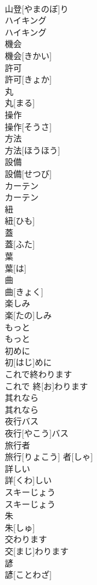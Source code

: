 \documentclass[8pt]{extreport}
\begin{document}
\begin{CJK}{UTF8}{min}
\\	山登[やまのぼ]り	
\\	ハイキング
\\	ハイキング
\\	機会	
\\	機会[きかい]	
\\	許可	
\\	許可[きょか]	
\\	丸	
\\	丸[まる]	
\\	操作	
\\	操作[そうさ]	
\\	方法	
\\	方法[ほうほう]	
\\	設備	
\\	設備[せつび]	
\\	カーテン	
\\	カーテン	
\\	紐	
\\	紐[ひも]	
\\	蓋	
\\	蓋[ふた]	
\\	葉	
\\	葉[は]	
\\	曲	
\\	曲[きょく]	
\\	楽しみ	
\\	楽[たの]しみ	
\\	もっと	
\\	もっと	
\\	初めに	
\\	初[はじ]めに	
\\	これで終わります	
\\	これで 終[お]わります	
\\	其れなら	
\\	其れなら	
\\	夜行バス	
\\	夜行[やこう]バス	
\\	旅行者	
\\	旅行[りょこう] 者[しゃ]	
\\	詳しい	
\\	詳[くわ]しい	
\\	スキーじょう	
\\	スキーじょう	
\\	朱	
\\	朱[しゅ]	
\\	交わります	
\\	交[まじ]わります	
\\	諺	
\\	諺[ことわざ]	

\end{CJK}
\end{document}
